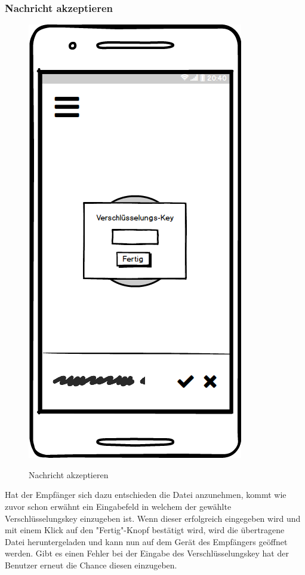 \subsubsection{Nachricht akzeptieren}
\begin{figure}[H]
	\centering
	\includegraphics[width=.5\linewidth]{pictures/Mobile/Nachrichtaccept.png}\
	\caption{Nachricht akzeptieren}
\end{figure}
Hat der Empfänger sich dazu entschieden die Datei anzunehmen, kommt wie zuvor schon erwähnt ein Eingabefeld in welchem der gewählte Verschlüsselungskey einzugeben ist. Wenn dieser erfolgreich eingegeben wird und mit einem Klick auf den "Fertig"-Knopf bestätigt wird, wird die übertragene Datei heruntergeladen und kann nun auf dem Gerät des Empfängers geöffnet werden. Gibt es einen Fehler bei der Eingabe des Verschlüsselungskey hat der Benutzer erneut die Chance diesen einzugeben.